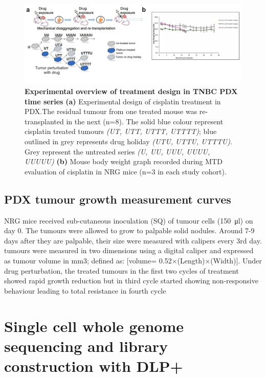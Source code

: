 \begin{figure}
\centering
\includegraphics[width=\textwidth]{Figures/treatmentdesignMTD.pdf}
	
\caption[Experimental overview of TNBC PDX treated time series]
	{\small
	\textbf{Experimental overview of treatment design in TNBC PDX time series}
\textbf{(a)} Experimental design of cisplatin treatment in PDX.The residual tumour from one treated mouse was re-transplanted in the next (n=8). The solid blue colour represent cisplatin treated tumours \textit{(UT, UTT, UTTT, UTTTT)}; blue outlined in grey represents drug holiday \textit{(UTU, UTTU, UTTTU)}. Grey represent the untreated series \textit{(U, UU, UUU, UUUU, UUUUU)} \textbf{(b)} Mouse body weight graph recorded during \ac{MTD} evaluation of cisplatin in NRG mice (n=3 in each study cohort).}
	
	\label{fig:treatmentdesignMTD}
\end{figure}




\subsection{PDX tumour growth measurement curves} 
NRG mice received sub-cutaneous inoculation (SQ) of tumour cells (\SI{150}{\ul}) on day 0. 
The tumours were allowed to grow to palpable solid nodules.
Around 7-9 days after they are palpable, their size were measured with calipers every 3rd day. 
tumours were measured in two dimensions using a digital caliper and expressed as tumour volume in mm3; defined as: [volume= 0.52$\times$(Length)$\times$(Width)].
Under drug perturbation, the treated tumours in the first two cycles of treatment showed rapid growth reduction but in third cycle started showing non-responsive behaviour leading to total resistance in fourth cycle 




\section{Single cell whole genome sequencing and library construction with DLP+}

